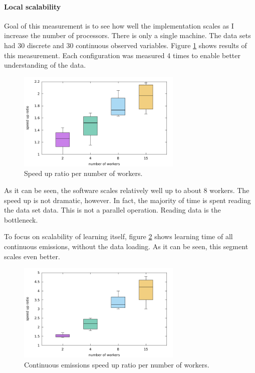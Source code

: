 \documentclass[thesis=B,english]{FITthesis}[2012/06/26]
\begin{document}
\paragraph{Local scalability}

Goal of this measurement is to see how well the implementation scales as I increase the number of processors. There is only a single machine. The data sets had 30 discrete and 30 continuous observed variables. Figure \ref{fig:parallel_learning_time} shows results of this measurement. Each configuration was measured 4 times to enable better understanding of the data.

\begin{figure}
	\centering
 	\includegraphics[width=0.7\textwidth]{parallel_learning_time}
 	\caption{Speed up ratio per number of workers.}
 	\label{fig:parallel_learning_time}
\end{figure}

As it can be seen, the software scales relatively well up to about 8 workers. The speed up is not dramatic, however. In fact, the majority of time is spent reading the data set data. This is not a parallel operation. Reading data is the bottleneck.

To focus on scalability of learning itself, figure \ref{fig:parallel_continuous_emissions_learning_time} shows learning time of all continuous emissions, without the data loading. As it can be seen, this segment scales even better.

\begin{figure}
	\centering
 	\includegraphics[width=0.7\textwidth]{parallel_continuous_emissions_learning_time}
 	\caption{Continuous emissions speed up ratio per number of workers.}
 	\label{fig:parallel_continuous_emissions_learning_time}
\end{figure}
\end{document}
